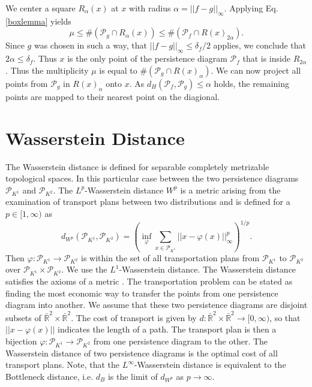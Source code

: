 \documentclass[runningheads]{llncs}
\begin{document}
We center a square $R_\alpha(x)$ at $x$ with radius $\alpha = ||f-g||_\infty$. Applying Eq. \ref{boxlemma} yields
\begin{equation}
\mu \leq \#(\mathcal{P}_g \cap R_\alpha(x)) \leq \#(\mathcal{P}_f \cap R(x)_{2\alpha}).
\end{equation}
Since $g$ was chosen in such a way, that $||f-g||_\infty \leq \delta_f / 2$ applies, we conclude that $2 \alpha \leq \delta_f$. Thus $x$ is the only point of the persistence diagram $\mathcal{P}_f$ that is inside $R_{2\alpha}$. Thus the multiplicity $\mu$ is equal to $\#(\mathcal{P}_g \cap R(x)_\alpha)$. We can now project all points from $\mathcal{P}_g$ in $R(x)_\alpha$ onto $x$. As $d_H(\mathcal{P}_f, \mathcal{P}_g) \leq \alpha$ holds, the remaining points are mapped to their nearest point on the diagional.

\section{Wasserstein Distance}
The Wasserstein distance is defined for separable completely metrizable topological spaces. In this particular case between the two persistence diagrams $\mathcal{P}_{K^1}$ and $\mathcal{P}_{K^2}$. The $L^p$-Wasserstein distance $W^p$ is a metric arising from the examination of transport plans between two distributions and is defined for a $p \in [1,\infty)$ as
\begin{equation}
d_{W^p}(\mathcal{P}_{K^1},\mathcal{P}_{K^2}) = \left(\inf_{\varphi} \sum_{x \in \mathcal{P}_{K^1}} ||x-\varphi(x)||^p_\infty\right)^{1/p}.
\end{equation}
Then $\varphi: \mathcal{P}_{K^1}\rightarrow \mathcal{P}_{K^2}$ is within the set of all transportation plans from $\mathcal{P}_{K^1}$ to $\mathcal{P}_{K^2}$ over $\mathcal{P}_{K^1} \times \mathcal{P}_{K^2}$. We use the $L^1$-Wasserstein distance. The Wasserstein distance satisfies the axioms of a metric \cite[p.~77]{villani2008optimal}. The transportation problem can be stated as finding the most economic way to transfer the points from one persistence diagram into another. We assume that these two persistence diagrams are disjoint subsets of $\bar{\mathbb{R}}^2 \times \bar{\mathbb{R}}^2$. The cost of transport is given by $d: \bar{\mathbb{R}}^2 \times \bar{\mathbb{R}}^2 \rightarrow [0,\infty)$, so that $||x-\varphi(x)||$ indicates the length of a path. The transport plan is then a bijection $\varphi: \mathcal{P}_{K^1} \rightarrow \mathcal{P}_{K^2}$ from one persistence diagram to the other. The Wasserstein distance of two persistence diagrams is the optimal cost of all transport plans. Note, that the $L^\infty$-Wasserstein distance is equivalent to the Bottleneck distance, i.e. $d_{B}$ is the limit of $d_{W^p}$ as $p \rightarrow \infty$.
\end{document}
